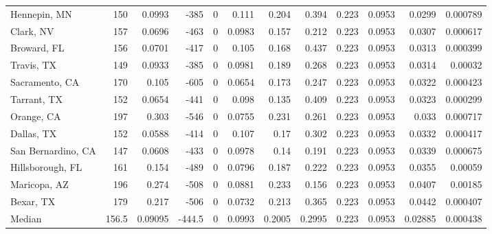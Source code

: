 \documentclass[12pt,letterpaper]{article}
\begin{document}
{\begin{appendices}
\begin{sidewaystable}
{\begin{tabular}{lrrrrrrrrrrr}
 Hennepin, MN       & 150   & 0.0993  & -385   &     0 &          0.111  &           0.204  &         0.394  &              0.223 &             0.0953 &           0.0299  &        0.000789 \\
 Clark, NV          & 157   & 0.0696  & -463   &     0 &          0.0983 &           0.157  &         0.212  &              0.223 &             0.0953 &           0.0307  &        0.000617 \\
 Broward, FL        & 156   & 0.0701  & -417   &     0 &          0.105  &           0.168  &         0.437  &              0.223 &             0.0953 &           0.0313  &        0.000399 \\
 Travis, TX         & 149   & 0.0933  & -385   &     0 &          0.0981 &           0.189  &         0.268  &              0.223 &             0.0953 &           0.0314  &        0.00032  \\
 Sacramento, CA     & 170   & 0.105   & -605   &     0 &          0.0654 &           0.173  &         0.247  &              0.223 &             0.0953 &           0.0322  &        0.000423 \\
 Tarrant, TX        & 152   & 0.0654  & -441   &     0 &          0.098  &           0.135  &         0.409  &              0.223 &             0.0953 &           0.0323  &        0.000299 \\
 Orange, CA         & 197   & 0.303   & -546   &     0 &          0.0755 &           0.231  &         0.261  &              0.223 &             0.0953 &           0.033   &        0.000717 \\
 Dallas, TX         & 152   & 0.0588  & -414   &     0 &          0.107  &           0.17   &         0.302  &              0.223 &             0.0953 &           0.0332  &        0.000417 \\
 San Bernardino, CA & 147   & 0.0608  & -433   &     0 &          0.0978 &           0.14   &         0.191  &              0.223 &             0.0953 &           0.0339  &        0.000675 \\
 Hillsborough, FL   & 161   & 0.154   & -489   &     0 &          0.0796 &           0.187  &         0.222  &              0.223 &             0.0953 &           0.0355  &        0.00059  \\
 Maricopa, AZ       & 196   & 0.274   & -508   &     0 &          0.0881 &           0.233  &         0.156  &              0.223 &             0.0953 &           0.0407  &        0.00185  \\
 Bexar, TX          & 179   & 0.217   & -506   &     0 &          0.0732 &           0.213  &         0.365  &              0.223 &             0.0953 &           0.0442  &        0.000407 \\
\hline
 Median             & 156.5 & 0.09095 & -444.5 &     0 &          0.0993 &           0.2005 &         0.2995 &              0.223 &             0.0953 &           0.02885 &        0.000438 \\
\hline
\end{tabular}

}
\end{sidewaystable}
\end{appendices}}
\end{document}
